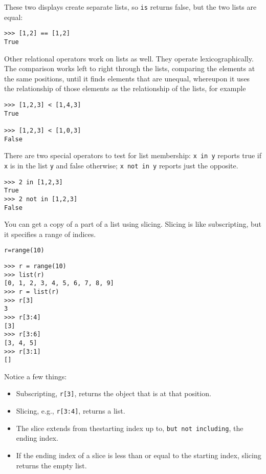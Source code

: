 These two displays create separate
lists, so \texttt{is} returns false, but the two lists are equal:

\begin{verbatim}
>>> [1,2] == [1,2]
True
\end{verbatim}



Other relational operators work on
lists as well. They operate lexicographically. The comparison works left
to right through the lists, comparing the elements at the same
positions, until it finds elements that are unequal, whereupon it uses
the relationship of those elements as the relationship of the lists, for
example

\begin{verbatim}
>>> [1,2,3] < [1,4,3]
True

>>> [1,2,3] < [1,0,3]
False    
\end{verbatim}

There are two special operators to
test for list membership: \texttt{x in y} reports true if \texttt{x} is in
the list \texttt{y} and false otherwise; \texttt{x not in y} reports just
the opposite.

\begin{verbatim}
>>> 2 in [1,2,3]
True
>>> 2 not in [1,2,3]
False  
\end{verbatim}

You can get a copy of a part of a
list using slicing. Slicing is like subscripting, but it specifies a
range of indices.


\texttt{r=range(10)}

\begin{verbatim}
>>> r = range(10)
>>> list(r)
[0, 1, 2, 3, 4, 5, 6, 7, 8, 9]
>>> r = list(r)
>>> r[3]
3
>>> r[3:4]
[3]
>>> r[3:6]
[3, 4, 5]
>>> r[3:1]
[]
\end{verbatim}

Notice a few things:

\begin{itemize}
\item
  Subscripting, \verb"r[3]", returns the object that is at that position.
\item
  Slicing, e.g., \verb"r[3:4]", returns a list.
\item
  The slice extends from thestarting index up to, \texttt{but not including}, the ending index.
\item
  If the ending index of a slice is less than or equal to the starting index, slicing returns the empty list.
\end{itemize}

